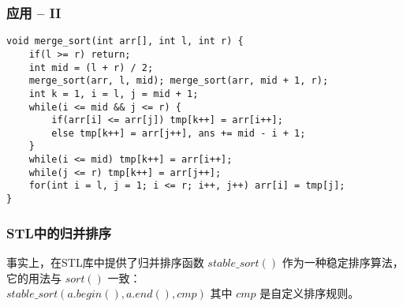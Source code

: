 \documentclass{beamer}
\begin{document}
\begin{frame}[fragile]
\frametitle{应用 -- II}
\begin{onlyenv}
\begin{verbatim}
void merge_sort(int arr[], int l, int r) {
    if(l >= r) return;
    int mid = (l + r) / 2;
    merge_sort(arr, l, mid); merge_sort(arr, mid + 1, r);
    int k = 1, i = l, j = mid + 1;
    while(i <= mid && j <= r) {
        if(arr[i] <= arr[j]) tmp[k++] = arr[i++];
        else tmp[k++] = arr[j++], ans += mid - i + 1;
    }
    while(i <= mid) tmp[k++] = arr[i++];
    while(j <= r) tmp[k++] = arr[j++];
    for(int i = l, j = 1; i <= r; i++, j++) arr[i] = tmp[j];
}
\end{verbatim}
\end{onlyenv}
\end{frame}
\begin{frame}
\frametitle{STL中的归并排序}
事实上，在STL库中提供了归并排序函数 $stable\_sort()$ 作为一种稳定排序算法，它的用法与 $sort()$ 一致： \\ 
$stable\_sort(a.begin(), a.end(), cmp)$ 其中 $cmp$ 是自定义排序规则。
\end{frame}
\end{document}
